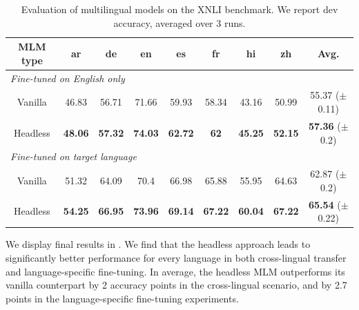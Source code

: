 \begin{table}[h]
\small
\centering
\begin{tabular}{c|cccccccc}
\toprule
MLM type        & ar             & de             & en             & es             & fr          & hi             & zh             & Avg.           \\ \midrule
\multicolumn{9}{l}{\textit{Fine-tuned on English only}} \\ \midrule
Vanilla  & 46.83          & 56.71          & 71.66          & 59.93          & 58.34       & 43.16          & 50.99          & 55.37 \tiny{($\pm$0.11)}          \\ 
Headless & \textbf{48.06} & \textbf{57.32} & \textbf{74.03} & \textbf{62.72} & \textbf{62} & \textbf{45.25} & \textbf{52.15} & \textbf{57.36} \tiny{($\pm$0.2)} \\ \midrule
\multicolumn{9}{l}{\textit{Fine-tuned on target language}} \\ \midrule
Vanilla  & 51.32          & 64.09          & 70.4           & 66.98          & 65.88          & 55.95 & 64.63          & 62.87 \tiny{($\pm$0.2)}         \\ 
Headless & \textbf{54.25} & \textbf{66.95} & \textbf{73.96} & \textbf{69.14} & \textbf{67.22} & \textbf{60.04} & \textbf{67.22} & \textbf{65.54} \tiny{($\pm$0.22)} \\ \bottomrule
\end{tabular}
\caption{Evaluation of multilingual models on the XNLI benchmark. We report dev accuracy, averaged over 3 runs.}
\end{table}

We display final results in . We find that the headless approach leads to significantly better performance for every language in both cross-lingual transfer and language-specific fine-tuning. In average, the headless MLM outperforms its vanilla counterpart by 2 accuracy points in the cross-lingual scenario, and by 2.7 points in the language-specific fine-tuning experiments.

